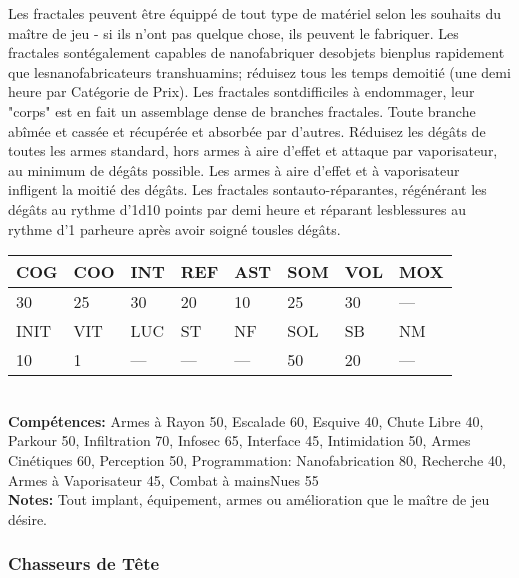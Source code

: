 Les fractales peuvent être équippé de tout type de matériel selon les souhaits du maître de jeu - si ils n'ont pas quelque chose, ils peuvent le fabriquer. Les fractales sontégalement capables de nanofabriquer desobjets bienplus rapidement que lesnanofabricateurs transhuamins; réduisez tous les temps demoitié (une demi heure par Catégorie de Prix). Les fractales sontdifficiles à endommager, leur "corps" est en fait un assemblage dense de branches fractales. Toute branche abîmée et cassée et récupérée et absorbée par d'autres. Réduisez les dégâts de toutes les armes standard, hors armes à aire d'effet et attaque par vaporisateur, au minimum de dégâts possible. Les armes à aire d'effet et à vaporisateur infligent la moitié des dégâts. Les fractales sontauto-réparantes, régénérant les dégâts au rythme d'1d10 points par demi heure et réparant lesblessures au rythme d'1 parheure après avoir soigné tousles dégâts. \\ \begin{tabular}{|l|l|l|l|l|l|l|l|} \hline

COG &COO &INT &REF &AST &SOM &VOL &MOX \\ \hline

30 &25 &30 &20 &10 &25 &30 &— \\ \hline

INIT &VIT &LUC &ST &NF &SOL &SB &NM \\ \hline

10 &1 &— &— &— &50 &20 &— \\ \hline

\end{tabular} \\ \textbf{Compétences:} Armes à Rayon 50, Escalade 60, Esquive 40, Chute Libre 40, Parkour 50, Infiltration 70, Infosec 65, Interface 45, Intimidation 50, Armes Cinétiques 60, Perception 50, Programmation: Nanofabrication 80, Recherche 40, Armes à Vaporisateur 45, Combat à mainsNues 55 \\ \textbf{Notes:} Tout implant, équipement, armes ou amélioration que le maître de jeu désire. 

\subsubsection{Chasseurs de Tête} 

